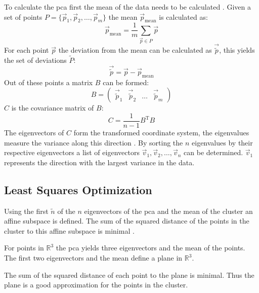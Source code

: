 To calculate the \ac{pca} first the mean of the data needs to be calculated \cite{pearson1901}. Given a set of points $P = \{\vec{p}_1, \vec{p}_2, \ldots, \vec{p}_m\}$ the mean $\vec{p}_\text{mean}$ is calculated as:
\begin{equation}
    \vec{p}_\text{mean} = \frac{1}{m} \sum_{\vec{p} \in P} \vec{p}
\end{equation}
For each point $\vec{p}$ the deviation from the mean can be calculated as $\vec{\tilde{p}}$, this yields the set of deviations $\tilde{P}$:
\begin{equation}
    \vec{\tilde{p}} = \vec{p} - \vec{p}_\text{mean}
\end{equation}
Out of these points a matrix $B$ can be formed:
\begin{equation}
    B =
    \begin{pmatrix}
        \vec{\tilde{p}}_1 & \vec{\tilde{p}}_2 & \ldots & \vec{\tilde{p}}_m
    \end{pmatrix}
\end{equation}
$C$ is the covariance matrix of $B$:
\begin{equation}
    C = \frac{1}{n-1} B^\text{T} B
\end{equation}
The eigenvectors of $C$ form the transformed coordinate system, the eigenvalues measure the variance along this direction \cite{hotelling1933analysis}. 
By sorting the $n$ eigenvalues by their respective eigenvectors a list of eigenvectors $\vec{v}_1, \vec{v}_2, \ldots, \vec{v}_n$ can be determined. 
$\vec{v}_1$ represents the direction with the largest variance in the data.

\subsection{Least Squares Optimization} \label{sec:theo:leastSquaresPlane}
Using the first $\tilde{n}$ of the $n$ eigenvectors of the \ac{pca} and the mean of the cluster an affine subspace is defined.
The sum of the squared distance of the points in the cluster to this affine subspace is minimal \cite{pearson1901}.

For points in $\mathbb{R}^3$ the \ac{pca} yields three eigenvectors and the mean of the points. 
The first two eigenvectors and the mean define a plane in $\mathbb{R}^3$.

The sum of the squared distance of each point to the plane is minimal. Thus the plane is a good approximation for the points in the cluster.
